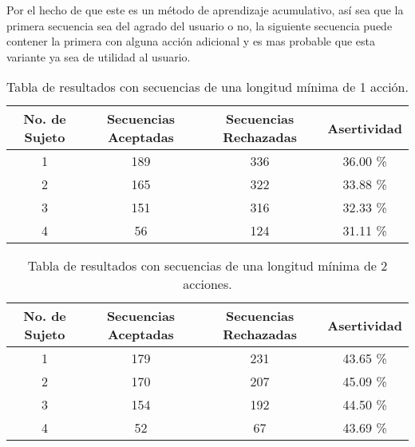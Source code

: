 Por el hecho de que este es un m\'etodo de aprendizaje acumulativo, as\'i sea
 que la primera secuencia sea del agrado del usuario o no, la siguiente 
 secuencia puede contener la primera con alguna acci\'on adicional y es mas 
 probable que esta variante ya sea de utilidad al usuario. 


\begin{table}[]
\centering
\begin{tabular}{cccc}
\hline
No. de Sujeto	
&	Secuencias Aceptadas	
&   Secuencias Rechazadas	
&	Asertividad		\\ \hline

1				
&	189						
&	336						
&	36.00 \%		\\

2				
&	165						
&	322						
&	33.88 \%		\\

3
&	151
&	316
&	32.33 \%		\\

4
&	56
&	124
&	31.11 \%		\\
\hline
\end{tabular}
\caption{Tabla de resultados con secuencias de una longitud m\'inima de 
 1 acci\'on.}
\label{tableRes1}
\end{table}



\begin{table}[]
\centering
\begin{tabular}{cccc}
\hline
No. de Sujeto
&	Secuencias Aceptadas
&   Secuencias Rechazadas
&	Asertividad		\\ \hline

1
&	179
&	231
&	43.65 \%		\\
	
2
&	170
&	207
&	45.09 \%		\\

3
&	154
&	192
&	44.50 \%		\\

4
&	52
&	67
&	43.69 \%		\\
\hline
\end{tabular}
\caption{Tabla de resultados con secuencias de una longitud m\'inima de 
 2 acciones.}
\label{tableRes2}
\end{table}



